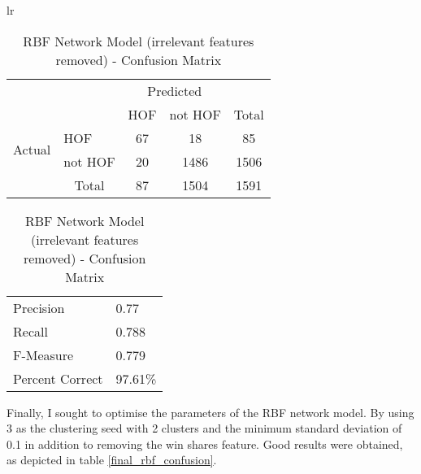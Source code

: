 \documentclass[paper=a4, fontsize=11pt]{scrartcl} %
\numberwithin{equation}{section} %
\numberwithin{figure}{section} %
\numberwithin{table}{section} %
\begin{document}
\begin{table}[thb]
\centering
\caption{\label{rbf_confusion_feature}RBF Network Model (irrelevant features removed) - Confusion Matrix}
\begin{tabular}{lr}

\begin{tabular}{l|l|c|c|c}
\multicolumn{2}{c}{}&\multicolumn{2}{c}{Predicted}&\\
\cline{3-4}
\multicolumn{2}{c|}{}& HOF & not HOF &\multicolumn{1}{c}{Total}\\
\cline{2-4}
\multirow{2}{*}{Actual}& HOF & 67 & 18 & 85\\
\cline{2-4}
& not HOF & 20 & 1486 & 1506\\
\cline{2-4}
\multicolumn{1}{c}{} & \multicolumn{1}{c}{Total} & \multicolumn{1}{c}{87} & \multicolumn{1}{c}{1504} & \multicolumn{1}{c}{1591}\\
\end{tabular}

\begin{tabular}{ | l | l | }
\hline
  Precision & 0.77 \\
  Recall & 0.788  \\
  F-Measure & 0.779 \\
  Percent Correct & 97.61\%\\
  \hline
\end{tabular}

\end{tabular}
\end{table}

Finally, I sought to optimise the parameters of the RBF network model. By using 3 as the clustering seed with 2 clusters and the minimum standard deviation of 0.1 in addition to removing the win shares feature. Good results were obtained, as depicted in table \ref{final_rbf_confusion}. 
\end{document}

